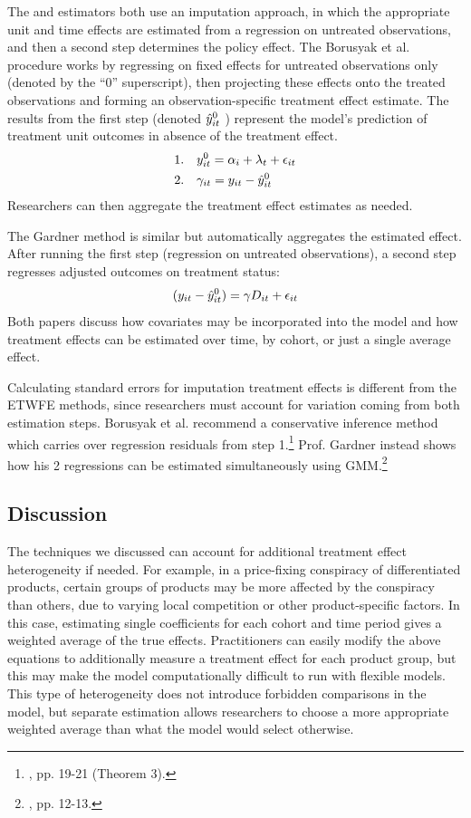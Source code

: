 \documentclass[12pt]{article}
\begin{document}
The \citet{borusyak2024revisiting} and \citet{gardner2022a} estimators both use an imputation approach, in which the appropriate unit and time effects are estimated from a regression on untreated observations, and then a second step determines the policy effect. The Borusyak et al. procedure works by regressing on fixed effects for untreated observations only (denoted by the “0” superscript), then projecting these effects onto the treated observations and forming an observation-specific treatment effect estimate. The results from the first step (denoted $\Hat{y}_{it}^0$ ) represent the model’s prediction of treatment unit outcomes in absence of the treatment effect.
\begin{align}
    1. \quad & y_{it}^0 = \alpha_i + \lambda_t + \epsilon_{it} \\
    2. \quad & \gamma_{it} = y_{it} - \Hat{y}_{it}^0
\end{align}
Researchers can then aggregate the treatment effect estimates as needed.

The Gardner method is similar but automatically aggregates the estimated effect. After running the first step (regression on untreated observations), a second step regresses adjusted outcomes on treatment status:
\begin{equation}
(y_{it} - \Hat{y}_{it}^0) = \gamma D_{it} + \epsilon_{it}    
\end{equation}
Both papers discuss how covariates may be incorporated into the model and how treatment effects can be estimated over time, by cohort, or just a single average effect.

Calculating standard errors for imputation treatment effects is different from the ETWFE methods, since researchers must account for variation coming from both estimation steps. Borusyak et al. recommend a conservative inference method which carries over regression residuals from step 1.\footnote{\citet{borusyak2024revisiting}, pp. 19-21 (Theorem 3).}  Prof. Gardner instead shows how his 2 regressions can be estimated simultaneously using GMM.\footnote{\citet{gardner2022a}, pp. 12-13.}
\subsection{Discussion}
The techniques we discussed can account for additional treatment effect heterogeneity if needed. For example, in a price-fixing conspiracy of differentiated products, certain groups of products may be more affected by the conspiracy than others, due to varying local competition or other product-specific factors. In this case, estimating single coefficients for each cohort and time period gives a weighted average of the true effects. Practitioners can easily modify the above equations to additionally measure a treatment effect for each product group, but this may make the model computationally difficult to run with flexible models. This type of heterogeneity does not introduce forbidden comparisons in the model, but separate estimation allows researchers to choose a more appropriate weighted average than what the model would select otherwise.
\end{document}
